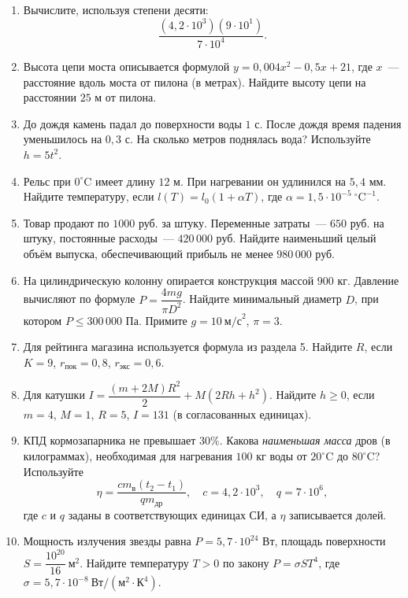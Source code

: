 \documentclass[a4paper,11pt]{article}
\begin{document}
\begin{enumerate}[label=\textbf{\arabic*.},itemsep=1.0em]
\item Вычислите, используя степени десяти:
\[
\frac{(4{,}2\cdot10^3)(9\cdot10^1)}{7\cdot10^4}.
\]

\item Высота цепи моста описывается формулой $y=0{,}004x^2-0{,}5x+21$, где $x$~--- расстояние вдоль моста от пилона (в метрах). Найдите высоту цепи на расстоянии $25$ м от пилона.

\item До дождя камень падал до поверхности воды $1$ с. После дождя время падения уменьшилось на $0{,}3$ с. На сколько метров поднялась вода? Используйте $h=5t^2$.

\item Рельс при $0^\circ\text{C}$ имеет длину $12$ м. При нагревании он удлинился на $5{,}4$ мм. Найдите температуру, если $l(T)=l_0(1+\alpha T)$, где $\alpha=1{,}5\cdot10^{-5}\ ^\circ\!\text{C}^{-1}$.

\item Товар продают по $1000$ руб. за штуку. Переменные затраты~--- $650$ руб. на штуку, постоянные расходы~--- $420\,000$ руб. Найдите наименьший целый объём выпуска, обеспечивающий прибыль не менее $980\,000$ руб.

\item На цилиндрическую колонну опирается конструкция массой $900$ кг. Давление вычисляют по формуле $P=\dfrac{4mg}{\pi D^2}$. Найдите минимальный диаметр $D$, при котором $P\le300\,000$ Па. Примите $g=10\ \text{м/с}^2$, $\pi=3$.

\item Для рейтинга магазина используется формула из раздела 5. Найдите $R$, если $K=9$, $r_{\text{пок}}=0{,}8$, $r_{\text{экс}}=0{,}6$.

\item Для катушки $I=\dfrac{(m+2M)R^2}{2}+M(2Rh+h^2)$. Найдите $h\ge0$, если $m=4$, $M=1$, $R=5$, $I=131$ (в согласованных единицах).

\item КПД кормозапарника не превышает $30\%$. Какова \emph{наименьшая масса} дров (в килограммах), необходимая для нагревания $100$ кг воды от $20^\circ\text{C}$ до $80^\circ\text{C}$? Используйте
\[
\eta=\frac{cm_{\text{в}}(t_2-t_1)}{qm_{\text{др}}},\quad
c=4{,}2\cdot10^3,\quad q=7\cdot10^6,
\]
где $c$ и $q$ заданы в соответствующих единицах СИ, а $\eta$ записывается долей.

\item Мощность излучения звезды равна $P=5{,}7\cdot10^{24}$ Вт, площадь поверхности $S=\dfrac{10^{20}}{16}\ \text{м}^2$. Найдите температуру $T>0$ по закону $P=\sigma ST^4$, где $\sigma=5{,}7\cdot10^{-8}\ \text{Вт}/(\text{м}^2\cdot\text{К}^4)$.
\end{enumerate}
\end{document}
